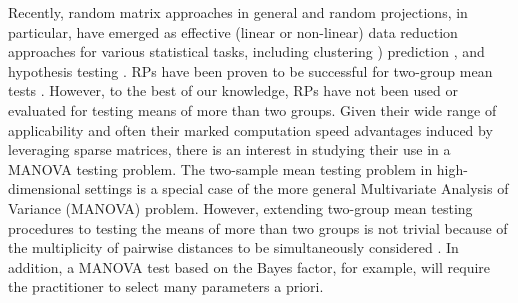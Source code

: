 \documentclass[alpha-refs]{wiley-article}
\theoremstyle{plain}%
\theoremstyle{definition}
\begin{document}
Recently, random matrix approaches in general and random projections, in particular, have emerged as effective (linear or non-linear) data reduction approaches for various statistical tasks, including clustering \citep{vrahatis2020ensemble,wan2020sharp}) prediction \citep{Mukhopadhyay2020targeted}, and hypothesis testing \citep{lopes2011more,srivastava2014raptt, zoh2018powerful}. RPs have been proven to be successful for two-group mean tests \citep{lopes2011more, srivastava2014raptt,zoh2018powerful}. However, to the best of our knowledge, RPs have not been used or evaluated for testing means of more than two groups. Given their wide range of applicability and often their marked computation speed advantages induced by leveraging sparse matrices, there is an interest in studying their use in a MANOVA testing problem. The two-sample mean testing problem in high-dimensional settings is a special case of the more general Multivariate Analysis of Variance (MANOVA) problem. However, extending two-group mean testing procedures to testing the means of more than two groups is not trivial because of the multiplicity of pairwise distances to be simultaneously considered \cite{cai2014high}. In addition, a MANOVA test based on the Bayes factor, for example, will require the practitioner to select many parameters a priori. 
\end{document}
